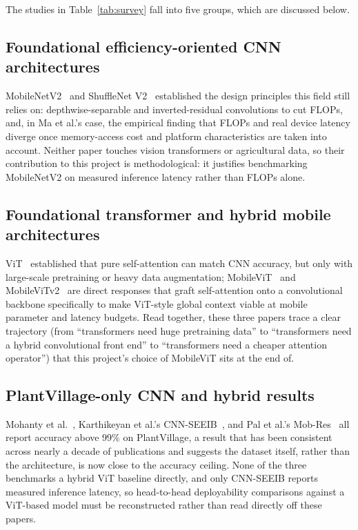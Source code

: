 \documentclass[conference]{IEEEtran}
\begin{document}
The studies in Table~\ref{tab:survey} fall into five groups, which are discussed below.

\subsection{Foundational efficiency-oriented CNN architectures}

MobileNetV2~\cite{sandler2018mobilenetv2} and ShuffleNet V2~\cite{ma2018shufflenetv2} established the design principles this field still relies on: depthwise-separable and inverted-residual convolutions to cut FLOPs, and, in Ma et al.'s case, the empirical finding that FLOPs and real device latency diverge once memory-access cost and platform characteristics are taken into account. Neither paper touches vision transformers or agricultural data, so their contribution to this project is methodological: it justifies benchmarking MobileNetV2 on measured inference latency rather than FLOPs alone.

\subsection{Foundational transformer and hybrid mobile architectures}

ViT~\cite{dosovitskiy2021vit} established that pure self-attention can match CNN accuracy, but only with large-scale pretraining or heavy data augmentation; MobileViT~\cite{mehta2022mobilevit} and MobileViTv2~\cite{mehta2022mobilevitv2} are direct responses that graft self-attention onto a convolutional backbone specifically to make ViT-style global context viable at mobile parameter and latency budgets. Read together, these three papers trace a clear trajectory (from ``transformers need huge pretraining data'' to ``transformers need a hybrid convolutional front end'' to ``transformers need a cheaper attention operator'') that this project's choice of MobileViT sits at the end of.

\subsection{PlantVillage-only CNN and hybrid results}

Mohanty et al.~\cite{mohanty2016plant}, Karthikeyan et al.'s CNN-SEEIB~\cite{karthikeyan2025cnnseeib}, and Pal et al.'s Mob-Res~\cite{pal2025mobres} all report accuracy above 99\% on PlantVillage, a result that has been consistent across nearly a decade of publications and suggests the dataset itself, rather than the architecture, is now close to the accuracy ceiling. None of the three benchmarks a hybrid ViT baseline directly, and only CNN-SEEIB reports measured inference latency, so head-to-head deployability comparisons against a ViT-based model must be reconstructed rather than read directly off these papers.
\end{document}
